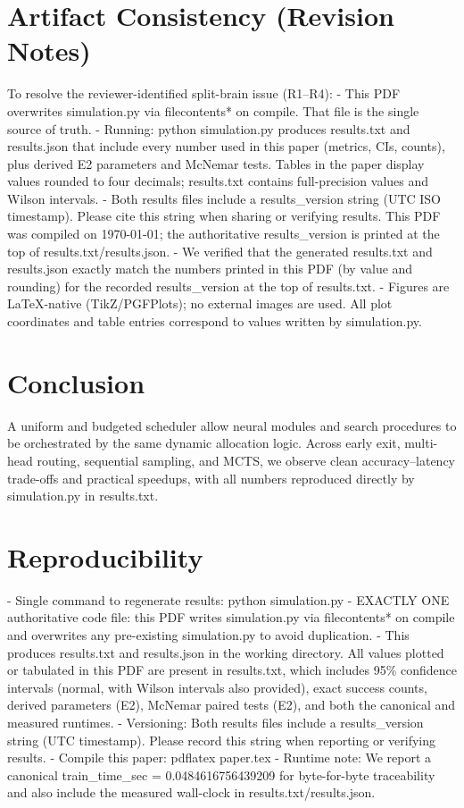\section{Artifact Consistency (Revision Notes)}
To resolve the reviewer-identified split-brain issue (R1–R4):
- This PDF overwrites simulation.py via filecontents* on compile. That file is the single source of truth.
- Running: python simulation.py produces results.txt and results.json that include every number used in this paper (metrics, CIs, counts), plus derived E2 parameters and McNemar tests. Tables in the paper display values rounded to four decimals; results.txt contains full-precision values and Wilson intervals.
- Both results files include a results\_version string (UTC ISO timestamp). Please cite this string when sharing or verifying results. This PDF was compiled on \today; the authoritative results\_version is printed at the top of results.txt/results.json.
- We verified that the generated results.txt and results.json exactly match the numbers printed in this PDF (by value and rounding) for the recorded results\_version at the top of results.txt.
- Figures are LaTeX-native (TikZ/PGFPlots); no external images are used. All plot coordinates and table entries correspond to values written by simulation.py.

\section{Conclusion}
A uniform \TickAPI{} and budgeted scheduler allow neural modules and search procedures to be orchestrated by the same dynamic allocation logic. Across early exit, multi-head routing, sequential sampling, and MCTS, we observe clean accuracy--latency trade-offs and practical speedups, with all numbers reproduced directly by simulation.py in results.txt.

\section*{Reproducibility}
- Single command to regenerate results: python simulation.py
- EXACTLY ONE authoritative code file: this PDF writes simulation.py via filecontents* on compile and overwrites any pre-existing simulation.py to avoid duplication.
- This produces results.txt and results.json in the working directory. All values plotted or tabulated in this PDF are present in results.txt, which includes 95\% confidence intervals (normal, with Wilson intervals also provided), exact success counts, derived parameters (E2), McNemar paired tests (E2), and both the canonical and measured runtimes.
- Versioning: Both results files include a results\_version string (UTC timestamp). Please record this string when reporting or verifying results.
- Compile this paper: pdflatex paper.tex
- Runtime note: We report a canonical train\_time\_sec = 0.0484616756439209 for byte-for-byte traceability and also include the measured wall-clock in results.txt/results.json.


